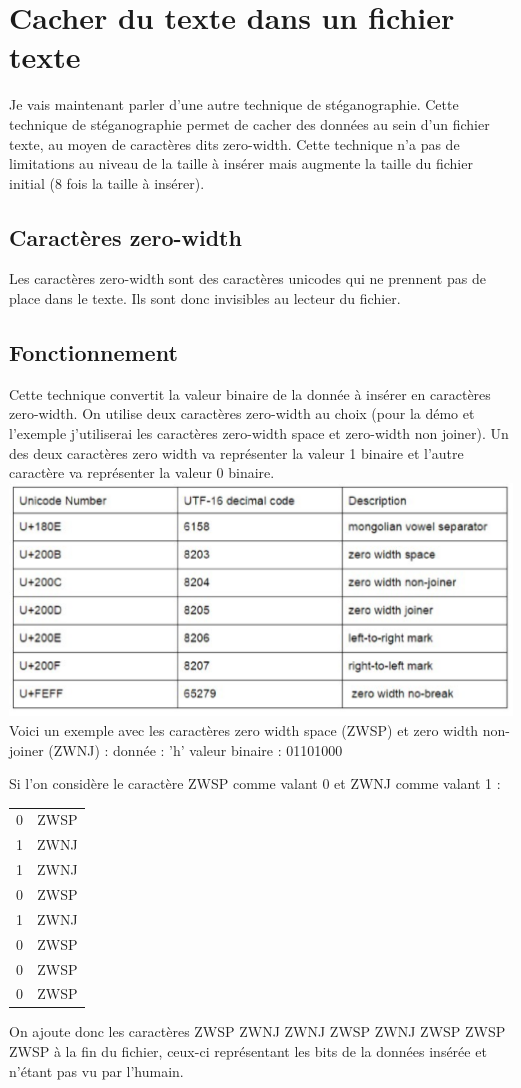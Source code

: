 \newpage
\section{Cacher du texte dans un fichier texte}
Je vais maintenant parler d'une autre technique de stéganographie. Cette technique de stéganographie permet de cacher des données au sein d'un fichier texte, au moyen de caractères dits zero-width.
\newline
Cette technique n'a pas de limitations au niveau de la taille à insérer mais augmente la taille du fichier initial (8 fois la taille à insérer).
\subsection{Caractères zero-width}
Les caractères zero-width sont des caractères unicodes qui ne prennent pas de place dans le texte. Ils sont donc invisibles au lecteur du fichier.
\subsection{Fonctionnement}
Cette technique convertit la valeur binaire de la donnée à insérer en caractères zero-width. On utilise deux caractères zero-width au choix (pour la démo et l'exemple j'utiliserai les caractères zero-width space et zero-width non joiner). Un des deux caractères zero width va représenter la valeur 1 binaire et l'autre caractère va représenter la valeur 0 binaire.
\newline
\includegraphics[width=1\textwidth]{img/zw-characters.eps}
\newline
Voici un exemple avec les caractères zero width space (ZWSP) et zero width non-joiner (ZWNJ) :
\newline
donnée : 'h'
valeur binaire : 01101000

Si l'on considère le caractère ZWSP comme valant 0 et ZWNJ comme valant 1 :
\begin{center}
\begin{tabular}{c c}
	0 & ZWSP \\
	1 & ZWNJ \\
	1 & ZWNJ \\
	0 & ZWSP \\
	1 & ZWNJ \\
	0 & ZWSP \\
	0 & ZWSP \\
	0 & ZWSP
\end{tabular}
\end{center}
On ajoute donc les caractères ZWSP ZWNJ ZWNJ ZWSP ZWNJ ZWSP ZWSP ZWSP à la fin du fichier, ceux-ci représentant les bits de la données insérée et n'étant pas vu par l'humain.
